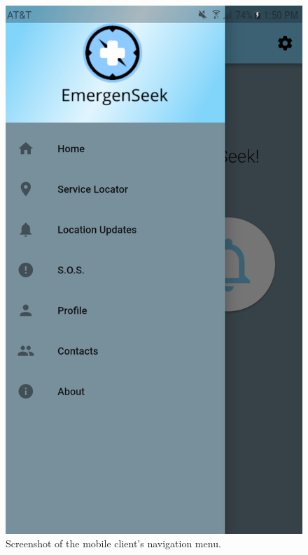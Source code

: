 \documentclass[10pt, a4paper]{article}
\begin{document}
\begin{figure}[!htb]
  \includegraphics[width=\linewidth]{demo_navmenu.png}
  \caption{Screenshot of the mobile client's navigation menu.}\label{fig:mobile2}
\endminipage\hfill
{}%

\end{figure}
\end{document}
